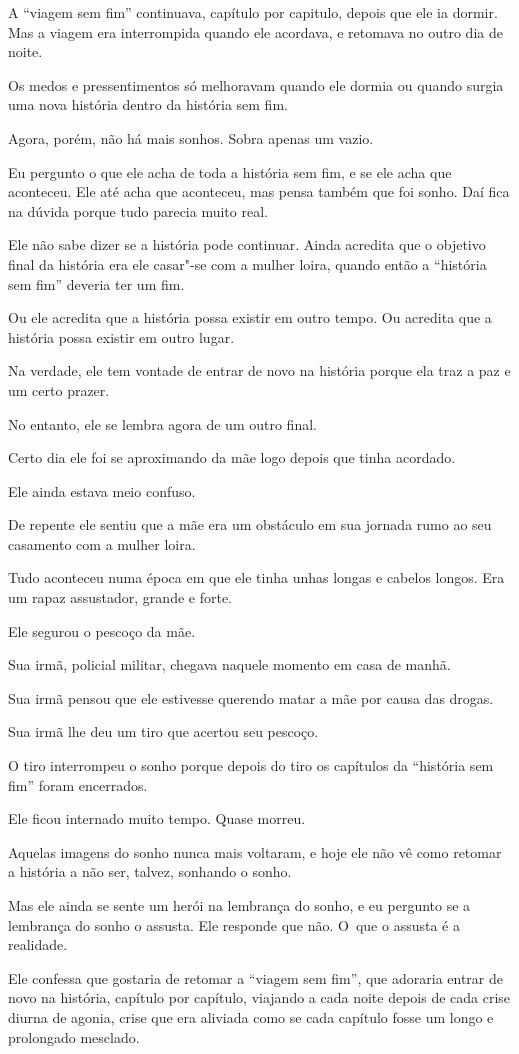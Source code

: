  

A ``viagem sem fim'' continuava, capítulo por capitulo, depois que ele
ia dormir. Mas a viagem era interrompida quando ele acordava, e retomava
no outro dia de noite.

Os medos e pressentimentos só melhoravam quando ele dormia ou quando
surgia uma nova história dentro da história sem fim.~

Agora, porém, não há mais sonhos. Sobra apenas um vazio.~

Eu pergunto o que ele acha de toda a história sem fim, e se ele acha que
aconteceu. Ele até acha que aconteceu, mas pensa também que foi sonho.
Daí fica na dúvida porque tudo parecia muito real.~

Ele não sabe dizer se a história pode continuar. Ainda acredita que o
objetivo final da história era ele casar"-se com a mulher loira, quando
então a ``história sem fim'' deveria ter um fim.~

Ou ele acredita que a história possa existir em outro tempo. Ou acredita
que a história possa existir em outro lugar.

Na verdade, ele tem vontade de entrar de novo na história porque ela traz
a paz e um certo prazer.~

No entanto, ele se lembra agora de um outro final.

Certo dia ele foi se aproximando da mãe logo depois que tinha acordado.

Ele ainda estava meio confuso.~

De repente ele sentiu que a mãe era um obstáculo em sua jornada rumo ao
seu casamento com a mulher loira.~

Tudo aconteceu numa época em que ele tinha unhas longas e cabelos
longos. Era um rapaz assustador, grande e forte.~

Ele segurou o pescoço da mãe.~

Sua irmã, policial militar, chegava naquele momento em casa de manhã.~

Sua irmã pensou que ele estivesse querendo matar a mãe por causa das
drogas.~

Sua irmã lhe deu um tiro que acertou seu pescoço.~

O tiro interrompeu o sonho porque depois do tiro os capítulos da
``história sem fim'' foram encerrados.~

Ele ficou internado muito tempo. Quase morreu.~

Aquelas imagens do sonho nunca mais voltaram, e hoje ele não vê como
retomar a história a não ser, talvez, sonhando o sonho.~

Mas ele ainda se sente um herói na lembrança do sonho, e eu pergunto se
a lembrança do sonho o assusta. Ele responde que não. O~que o assusta é
a realidade.~

Ele confessa que gostaria de retomar a ``viagem sem fim'', que adoraria
entrar de novo na história, capítulo por capítulo, viajando a cada noite
depois de cada crise diurna de agonia, crise que era aliviada como se
cada capítulo fosse um longo e prolongado mesclado. ~~

\subsubsection{}
